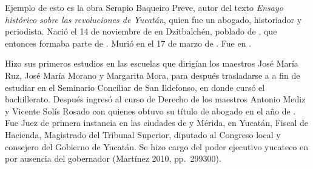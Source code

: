 Ejemplo de esto es la obra Serapio Baqueiro Preve,  autor del texto
\textit{Ensayo histórico sobre las revoluciones de Yucatán}, quien fue
un abogado, historiador y periodista. Nació el 14 de
noviembre
de \href{http://es.wikipedia.org/wiki/1838}{\textstyleInternetLink{\textcolor[rgb]{0.0,0.0,0.039215688}{1838}}} en Dzitbalchén, poblado de
\href{http://es.wikipedia.org/wiki/Campeche}{\textstyleInternetLink{\textcolor[rgb]{0.0,0.0,0.039215688}{Campeche}}},
que entonces formaba parte de
\href{http://es.wikipedia.org/wiki/Yucatán}{\textstyleInternetLink{\textcolor[rgb]{0.0,0.0,0.039215688}{Yucatán}}}.
Murió en
\href{http://es.wikipedia.org/wiki/Mérida_(Yucatán)}{\textstyleInternetLink{\textcolor[rgb]{0.0,0.0,0.039215688}{Mérida}}} el 17 de marzo de \href{http://es.wikipedia.org/wiki/1900}{\textstyleInternetLink{\textcolor[rgb]{0.0,0.0,0.039215688}{1900}}}.
Fue \href{http://es.wikipedia.org/wiki/Gobernantes_de_Yucatán}{\textstyleInternetLink{\textcolor[rgb]{0.0,0.0,0.039215688}{gobernador
provisional de Yucatán}}} en \href{http://es.wikipedia.org/wiki/1883}{\textstyleInternetLink{\textcolor[rgb]{0.0,0.0,0.039215688}{1883}}}.


Hizo sus primeros estudios en las escuelas que dirigían los maestros José
María Ruz, José María Morano y Margarita Mora, para después trasladarse a
\href{http://es.wikipedia.org/wiki/Mérida_(Yucatán)}{\textstyleInternetLink{\textcolor[rgb]{0.0,0.0,0.039215688}{Mérida
(Yucatán)}}} a fin de estudiar en el
Seminario Conciliar de San Ildefonso, en donde cursó el bachillerato.
Después ingresó al curso de Derecho de los maestros Antonio Mediz y Vicente
Solís Rosado con quienes obtuvo su título de abogado en el año
de \href{http://es.wikipedia.org/wiki/1863}{\textstyleInternetLink{\textcolor[rgb]{0.0,0.0,0.039215688}{1863}}}.
Fue Juez de primera instancia en las ciudades
de \href{http://es.wikipedia.org/wiki/Tekax}{} y Mérida, en Yucatán, Fiscal de Hacienda, Magistrado del Tribunal
Superior, diputado al Congreso local y consejero del Gobierno de %
Yucatán. Se hizo cargo del poder ejecutivo yucateco
en \href{http://es.wikipedia.org/wiki/1883}{\textstyleInternetLink{\textcolor[rgb]{0.0,0.0,0.039215688}{1883}}} por ausencia del gobernador
\textstyleInternetLink{\textcolor[rgb]{0.0,0.0,0.039215688}{Octavio Rosado
}}(Martínez 2010, pp.~299\textendash{}300).
\enlargethispage{1\baselineskip}
 

